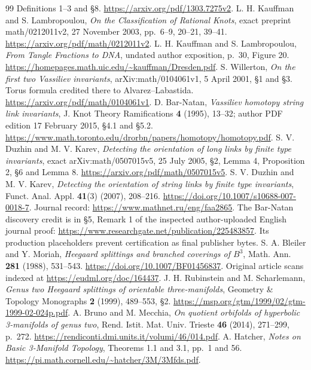 \documentclass[11pt]{article}
\theoremstyle{remark}\newtheorem{remark}[theorem]{Remark}
\begin{document}
\begin{thebibliography}{99}
Definitions 1--3 and \S8.
\url{https://arxiv.org/pdf/1303.7275v2}.
 L. H. Kauffman and S. Lambropoulou, \emph{On the Classification
of Rational Knots}, exact preprint math/0212011v2, 27 November 2003,
pp.~6--9, 20--21, 39--41.
\url{https://arxiv.org/pdf/math/0212011v2}.
 L. H. Kauffman and S. Lambropoulou, \emph{From Tangle
Fractions to DNA}, undated author exposition, p.~30, Figure 20.
\url{https://homepages.math.uic.edu/~kauffman/Dresden.pdf}.
 S. Willerton, \emph{On the first two Vassiliev
invariants}, arXiv:math/0104061v1, 5 April 2001, \S1 and \S3.
Torus formula credited there to Alvarez--Labastida.
\url{https://arxiv.org/pdf/math/0104061v1}.
 D. Bar-Natan, \emph{Vassiliev homotopy string link
invariants}, J. Knot Theory Ramifications \textbf{4} (1995), 13--32;
author PDF edition 17 February 2015, \S4.1 and \S5.2.
\url{https://www.math.toronto.edu/drorbn/papers/homotopy/homotopy.pdf}.
 S. V. Duzhin and M. V. Karev, \emph{Detecting the orientation
of long links by finite type invariants}, exact arXiv:math/0507015v5,
25 July 2005, \S2, Lemma 4, Proposition 2, \S6 and Lemma 8.
\url{https://arxiv.org/pdf/math/0507015v5}.
 S. V. Duzhin and M. V. Karev, \emph{Detecting the
orientation of string links by finite type invariants}, Funct. Anal. Appl.
\textbf{41}(3) (2007), 208--216.
\url{https://doi.org/10.1007/s10688-007-0018-7}.
Journal record: \url{https://www.mathnet.ru/eng/faa2865}.
The Bar-Natan discovery credit is in \S5, Remark 1 of the inspected
author-uploaded English journal proof:
\url{https://www.researchgate.net/publication/225483857}.
Its production placeholders prevent certification as final publisher bytes.
 S. A. Bleiler and Y. Moriah, \emph{Heegaard
splittings and branched coverings of $B^3$}, Math. Ann. \textbf{281}
(1988), 531--543. \url{https://doi.org/10.1007/BF01456837}.
Original article scans indexed at \url{https://eudml.org/doc/164437}.
 J. H. Rubinstein and M. Scharlemann, \emph{Genus two Heegaard
splittings of orientable three-manifolds}, Geometry \& Topology Monographs
\textbf{2} (1999), 489--553, \S2.
\url{https://msp.org/gtm/1999/02/gtm-1999-02-024p.pdf}.
 A. Bruno and M. Mecchia, \emph{On quotient orbifolds of
hyperbolic 3-manifolds of genus two}, Rend. Istit. Mat. Univ. Trieste
\textbf{46} (2014), 271--299, p.~272.
\url{https://rendiconti.dmi.units.it/volumi/46/014.pdf}.
 A. Hatcher, \emph{Notes on Basic 3-Manifold Topology},
Theorems 1.1 and 3.1, pp.~1 and 56.
\url{https://pi.math.cornell.edu/~hatcher/3M/3Mfds.pdf}.

\end{thebibliography}
\end{document}

